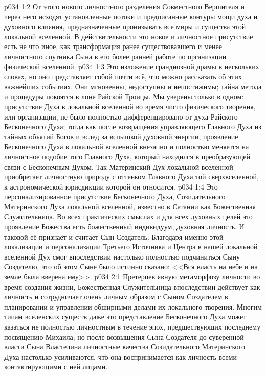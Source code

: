 \vs p034 1:2 От этого нового личностного разделения Совместного Вершителя и через него исходят установленные потоки и предписанные контуры мощи духа и духовного влияния, предназначенные пронизывать все миры и существа этой локальной вселенной. В действительности это новое и личностное присутствие есть не что иное, как трансформация ранее существовавшего и менее личностного спутника Сына в его более ранней работе по организации физической вселенной.
\vs p034 1:3 \pc Это изложение грандиозной драмы в нескольких словах, но оно представляет собой почти всё, что можно рассказать об этих важнейших событиях. Они мгновенны, недоступны и непостижимы; тайна метода и процедуры покоятся в лоне Райской Троицы. Мы уверены только в одном: присутствие Духа в локальной вселенной во время чисто физического творения, или организации, не было полностью дифференцировано от духа Райского Бесконечного Духа; тогда как после возвращения управляющего Главного Духа из тайных объятий Богов и вслед за вспышкой духовной энергии, проявление Бесконечного Духа в локальной вселенной внезапно и полностью меняется на личностное подобие того Главного Духа, который находился в преобразующей связи с Бесконечным Духом. Так Материнский Дух локальной вселенной приобретает личностную природу с оттенком Главного Духа той сверхвселенной, к астрономической юрисдикции которой он относится.
\vs p034 1:4 Это персонализированное присутствие Бесконечного Духа, Созидательного Материнского Духа локальной вселенной, известно в Сатании как Божественная Служительница. Во всех практических смыслах и для всех духовных целей это проявление Божества есть божественный индивидуум, духовная личность. И таковой её признаёт и считает Сын Создатель. Благодаря именно этой локализации и персонализации Третьего Источника и Центра в нашей локальной вселенной Дух смог впоследствии настолько полностью подчиниться Сыну Создателю, что об этом Сыне было истинно сказано: <<Вся власть на небе и на земле была вверена ему>>.
\vs p034 2:1 Претерпев явную метаморфозу личности во время создания жизни, Божественная Служительница впоследствии действует как личность и сотрудничает очень личным образом с Сыном Создателем в планировании и управлении обширными делами их локального творения. Многим типам вселенских существ даже это представление Бесконечного Духа может казаться не полностью личностным в течение эпох, предшествующих последнему посвящению Михаила; но после возвышения Сына Создателя до суверенной власти Сына Властелина личностные качества Созидательного Материнского Духа настолько усиливаются, что она воспринимается как личность всеми контактирующими с ней лицами.
